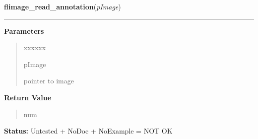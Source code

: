 \hspace{.8\funcindent}\begin{boxedminipage}{\funcwidth}

    \raggedright \textbf{flimage\_read\_annotation}(\textit{pImage})

    \vspace{-1.5ex}

    \rule{\textwidth}{0.5\fboxrule}
\setlength{\parskip}{2ex}
\setlength{\parskip}{1ex}
      \textbf{Parameters}
      \vspace{-1ex}

      \begin{quote}
        \begin{Ventry}{xxxxxx}

          \item[pImage]

          pointer to image

        \end{Ventry}

      \end{quote}

      \textbf{Return Value}
    \vspace{-1ex}

      \begin{quote}
      num

      \end{quote}

\textbf{Status:} Untested + NoDoc + NoExample = NOT OK



    \end{boxedminipage}

    \label{xformslib:library:flimage_replace_image}

    \vspace{0.5ex}


